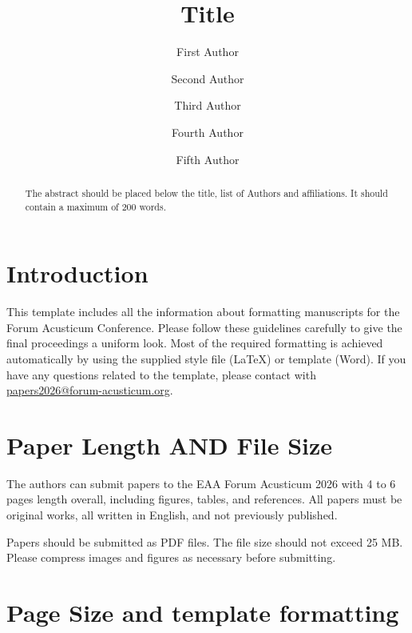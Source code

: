 \documentclass[non-peer-review]{fa2026}
\title{Title}
\author[1]{First Author}
\author[1]{Second Author}
\author[2]{Third Author}
\author[3]{Fourth Author}
\author[2,3]{Fifth Author}
\affil[1]{Department of Computer Science, University, Country}
\affil[2]{International Laboratories, City, Country}
\affil[3]{Company, Address}
\begin{document}
\maketitle

\begin{abstract}
The abstract should be placed below the title, list of Authors and affiliations. It should contain a maximum of 200 words.
\end{abstract}



\section{Introduction}\label{sec:introduction}

This template includes all the information about formatting manuscripts for the Forum Acusticum Conference. Please follow these guidelines carefully to give the final proceedings a uniform look. Most of the required formatting is achieved automatically by using the supplied style file (\LaTeX) or template (Word). If you have any questions related to the template, please contact with \href{mailto:papers2026@forum-acusticum.org}{papers2026@forum-acusticum.org}.


\section{Paper Length AND File Size}
The authors can submit papers to the EAA Forum Acusticum 2026 with 4 to 6 pages length overall, including figures, tables, and references. All papers must be original works, all written in English, and not previously published. 

Papers should be submitted as PDF files. The file size should not exceed 25 MB. Please compress images and figures as necessary before submitting.


\section{Page Size and template formatting}\label{sec:page_size}
\end{document}
